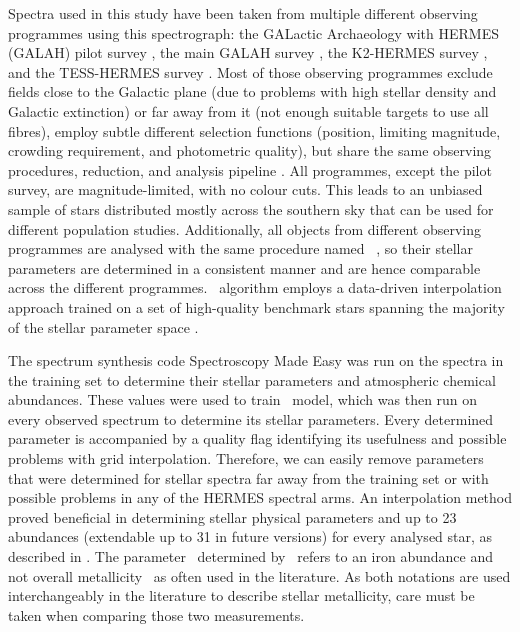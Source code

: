 Spectra used in this study have been taken from multiple different observing programmes using this spectrograph: the GALactic Archaeology with HERMES (GALAH) pilot survey \citep{2018MNRAS.tmp..504D}, the main GALAH survey \citep{2015MNRAS.449.2604D}, the K2-HERMES survey \citep{2016AAS...22713816W}, and the TESS-HERMES survey \citep{2018MNRAS.473.2004S}. Most of those observing programmes exclude fields close to the Galactic plane (due to problems with high stellar density and Galactic extinction) or far away from it (not enough suitable targets to use all fibres), employ subtle different selection functions (position, limiting magnitude, crowding requirement, and photometric quality), but share the same observing procedures, reduction, and analysis pipeline \citep[internal version 5.3,][]{2017MNRAS.464.1259K}. All programmes, except the pilot survey, are magnitude-limited, with no colour cuts. This leads to an unbiased sample of stars distributed mostly across the southern sky that can be used for different population studies. Additionally, all objects from different observing programmes are analysed with the same procedure named \TC\ \citep[internal version 180325,][]{2015ApJ...808...16N, buder2018}, so their stellar parameters are determined in a consistent manner and are hence comparable across the different programmes. \TC\ algorithm employs a data-driven interpolation approach trained on a set of high-quality benchmark stars spanning the majority of the stellar parameter space \citep[for details, see][]{buder2018}. 

The spectrum synthesis code Spectroscopy Made Easy \citep[SME, ][]{1996A&AS..118..595V, 2017A&A...597A..16P} was run on the spectra in the training set to determine their stellar parameters and atmospheric chemical abundances. These values were used to train \TC\ model, which was then run on every observed spectrum to determine its stellar parameters. Every determined parameter is accompanied by a quality flag identifying its usefulness and possible problems with grid interpolation. Therefore, we can easily remove parameters that were determined for stellar spectra far away from the training set or with possible problems in any of the HERMES spectral arms. An interpolation method proved beneficial in determining stellar physical parameters and up to 23 abundances (extendable up to 31 in future versions) for every analysed star, as described in \citet{buder2018}. The parameter \Feh\ determined by \TC\ refers to an iron abundance and not overall metallicity \Meh\ as often used in the literature. As both notations are used interchangeably in the literature to describe stellar metallicity, care must be taken when comparing those two measurements.


